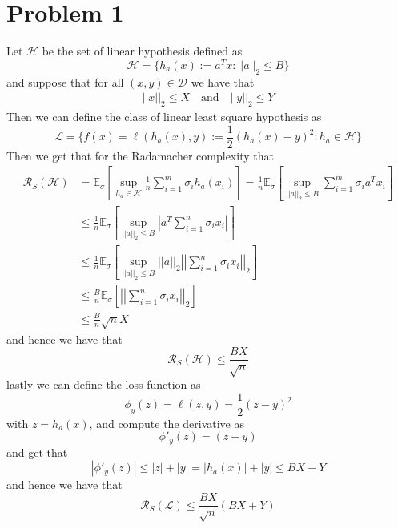 \documentclass[12pt]{report}
\newcommand{\norm}[1]{\left|\left|#1\right|\right|}
\begin{document}
\maketitle

\section*{Problem 1}
Let $\mathcal{H}$ be the set of linear hypothesis defined as
\begin{equation*}
\mathcal{H} = \{h_a(x):= a^Tx : \norm{a}_2 \leq B\}
\end{equation*}
and suppose that for all $(x,y) \in \mathcal{D}$ we have that 
\begin{align*}
  \norm{x}_2 \leq X \quad \text{and} \quad \norm{y}_2 \leq Y
\end{align*}
Then we can define the class of linear least square hypothesis as
\begin{equation*}
  \mathcal{L} = \{f(x) = \ell(h_a(x),y) := \frac{1}{2} (h_a(x) - y)^2 : h_a \in \mathcal{H}\}
\end{equation*}
Then we get that for the Radamacher complexity that
\begin{align*}
\mathcal{R}_{S}(\mathcal{H}) &= \mathbb{E}_{\sigma} \left[ \sup_{h_a \in \mathcal{H}} \frac{1}{n} \sum_{i=1}^{m} \sigma_i h_a(x_i) \right] = \frac{1}{n} \mathbb{E}_{\sigma} \left[ \sup_{\norm{a}_2 \leq B} \sum_{i=1}^{m} \sigma_i a^Tx_i \right] \\
&\leq \frac{1}{n} \mathbb{E}_{\sigma} \left[\sup_{\norm{a}_2 \leq B} \left|a^T \sum_{i=1}^n \sigma_i x_i\right|\right] \\
&\leq \frac{1}{n}\mathbb{E}_{\sigma} \left[\sup_{\norm{a}_2 \leq B}\norm{a}_2 \norm{\sum_{i=1}^n \sigma_i x_i}_2\right] \\
&\leq \frac{B}{n} \mathbb{E}_{\sigma} \left[\norm{\sum_{i=1}^n \sigma_i x_i}_2\right] \\
&\leq \frac{B}{n} \sqrt{n} X
\end{align*}
and hence we have that
\begin{equation*}
  \mathcal{R}_{S}(\mathcal{H}) \leq \frac{BX}{\sqrt{n}}
\end{equation*}
lastly we can define the loss function as
\begin{equation*}
  \phi_y(z) = \ell(z,y) =  \frac{1}{2} (z-y)^2
\end{equation*}
with $z = h_a(x)$, and compute the derivative as
\begin{equation*}
  \phi'_y(z) = (z-y) 
\end{equation*}
and get that
\begin{equation*}
  |\phi'_y(z)| \leq |z| + |y| = |h_a(x)| + |y| \leq BX + Y
\end{equation*}
and hence we have that 
\begin{equation*}
  \mathcal{R}_{S}(\mathcal{L}) \leq \frac{BX}{\sqrt{n}}(BX + Y)
\end{equation*}
\end{document}
